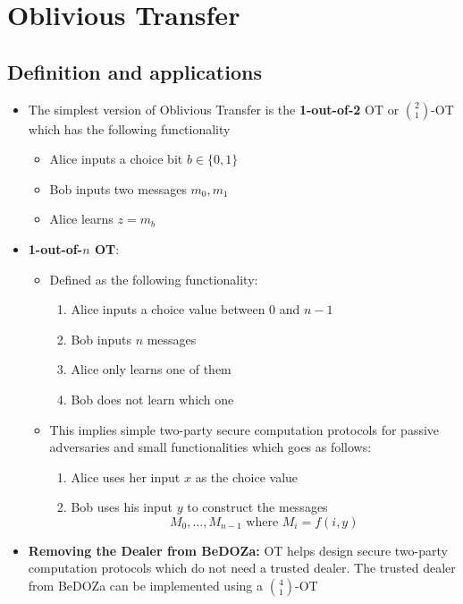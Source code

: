 \section{Oblivious Transfer}
\localtableofcontents
\subsection{Definition and applications}%
\begin{itemize}
    \item The simplest version of Oblivious Transfer is the \textbf{1-out-of-2} OT or $2 \choose 1$-OT which has the following functionality
    \begin{itemize}
        \item Alice inputs a choice bit $b \in \{0,1\}$
        \item Bob inputs two messages $m_0, m_1$ 
        \item Alice learns $z = m_b$
    \end{itemize}
    \item \textbf{1-out-of-$n$ OT}: 
    \begin{itemize}
        \item Defined as the following functionality:
        \begin{enumerate}
            \item Alice inputs a choice value between $0$ and $n-1$
            \item Bob inputs $n$ messages 
            \item Alice only learns one of them 
            \item Bob does not learn which one
        \end{enumerate}
        \item This implies simple two-party secure computation protocols for passive adversaries and small functionalities which goes as follows:
        \begin{enumerate}
            \item Alice uses her input $x$ as the choice value
            \item Bob uses his input $y$ to construct the messages 
            \begin{equation*}
                M_0, \dots, M_{n-1} \text{ where } M_i = f(i,y)
            \end{equation*}
        \end{enumerate}
    \end{itemize}
    \item \textbf{Removing the Dealer from BeDOZa:} OT helps design secure two-party computation protocols which do not need a trusted dealer. The trusted dealer from BeDOZa can be implemented using a $4 \choose 1$-OT

\end{itemize}
